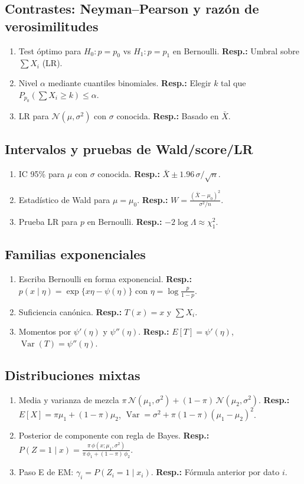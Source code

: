 	\subsection*{Contrastes: Neyman--Pearson y razón de verosimilitudes}
	\begin{enumerate}
		\item Test óptimo para $H_0:p=p_0$ vs $H_1:p=p_1$ en Bernoulli. \textbf{Resp.:} Umbral sobre $\sum X_i$ (LR).
		\item Nivel $\alpha$ mediante cuantiles binomiales. \textbf{Resp.:} Elegir $k$ tal que $P_{p_0}(\sum X_i\ge k)\le\alpha$.
		\item LR para $\mathcal N(\mu,\sigma^2)$ con $\sigma$ conocida. \textbf{Resp.:} Basado en $\bar X$.
	\end{enumerate}
	
	\subsection*{Intervalos y pruebas de Wald/score/LR}
	\begin{enumerate}
		\item IC 95\% para $\mu$ con $\sigma$ conocida. \textbf{Resp.:} $\bar X\pm1.96\,\sigma/\sqrt n$.
		\item Estadístico de Wald para $\mu=\mu_0$. \textbf{Resp.:} $W=\frac{(\bar X-\mu_0)^2}{\sigma^2/n}$.
		\item Prueba LR para $p$ en Bernoulli. \textbf{Resp.:} $-2\log\Lambda\approx\chi^2_1$.
	\end{enumerate}
	
	\subsection*{Familias exponenciales}
	\begin{enumerate}
		\item Escriba Bernoulli en forma exponencial. \textbf{Resp.:} $p(x\mid\eta)=\exp\{x\eta-\psi(\eta)\}$ con $\eta=\log\frac{p}{1-p}$.
		\item Suficiencia canónica. \textbf{Resp.:} $T(x)=x$ y $\sum X_i$.
		\item Momentos por $\psi'(\eta)$ y $\psi''(\eta)$. \textbf{Resp.:} $E[T]=\psi'(\eta)$, $\operatorname{Var}(T)=\psi''(\eta)$.
	\end{enumerate}
	
	\subsection*{Distribuciones mixtas}
	\begin{enumerate}
		\item Media y varianza de mezcla $\pi\,\mathcal N(\mu_1,\sigma^2)+(1-\pi)\,\mathcal N(\mu_2,\sigma^2)$. \textbf{Resp.:} $E[X]=\pi\mu_1+(1-\pi)\mu_2$, $\operatorname{Var}=\sigma^2+\pi(1-\pi)(\mu_1-\mu_2)^2$.
		\item Posterior de componente con regla de Bayes. \textbf{Resp.:} $P(Z=1\mid x)=\frac{\pi\,\phi(x;\mu_1,\sigma^2)}{\pi\,\phi_1+(1-\pi)\,\phi_2}$.
		\item Paso E de EM: $\gamma_i=P(Z_i=1\mid x_i)$. \textbf{Resp.:} Fórmula anterior por dato $i$.
	\end{enumerate}
	
